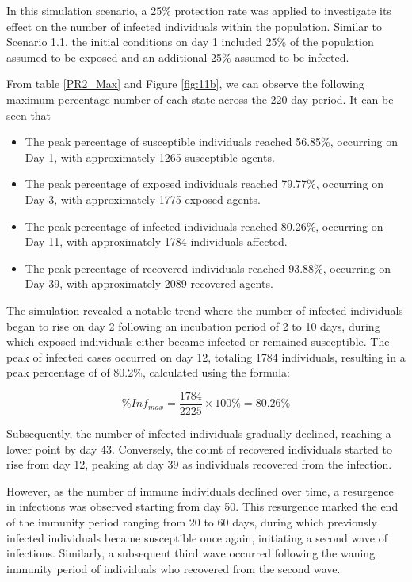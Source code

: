 In this simulation scenario, a 25\% protection rate was applied to investigate its effect on the number of infected individuals within the population. Similar to Scenario 1.1, the initial conditions on day 1 included 25\%  of the population assumed to be exposed and an additional 25\%  assumed to be infected.

From table \ref{PR2_Max} and Figure \ref{fig:11b}, we can observe the following maximum percentage number of each state across the 220 day period. It can be seen that 

\begin{itemize}
	\item The peak percentage of susceptible individuals reached 56.85\%, occurring on Day 1, with approximately 1265 susceptible agents.
	\item The peak percentage of exposed individuals reached 79.77\%, occurring on Day 3, with approximately 1775 exposed agents.
	\item The peak percentage of infected individuals reached 80.26\%, occurring on Day 11, with approximately 1784 individuals affected.
	\item The peak percentage of recovered individuals reached 93.88\%, occurring on Day 39, with approximately 2089 recovered agents.
\end{itemize}

The simulation revealed a notable trend where the number of infected individuals began to rise on day 2 following an incubation period of 2 to 10 days, during which exposed individuals either became infected or remained susceptible. The peak of infected cases occurred on day 12, totaling 1784 individuals, resulting in a peak percentage of of 80.2\%, calculated using the formula:

\[ \%Inf_{max}  = \frac{1784}{2225} \times 100\%  = 80.26\% \]

Subsequently, the number of infected individuals gradually declined, reaching a lower point by day 43. Conversely, the count of recovered individuals started to rise from day 12, peaking at day 39 as individuals recovered from the infection.

However, as the number of immune individuals declined over time, a resurgence in infections was observed starting from day 50. This resurgence marked the end of the immunity period ranging from 20 to 60 days, during which previously infected individuals became susceptible once again, initiating a second wave of infections. Similarly, a subsequent third wave occurred following the waning immunity period of individuals who recovered from the second wave.

